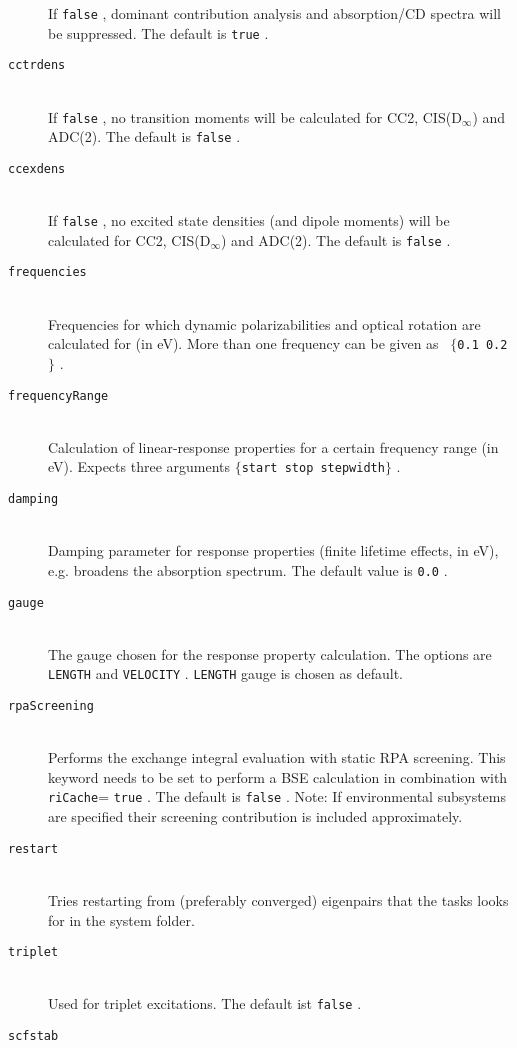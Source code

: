 \documentclass[bibliography=totocnumbered,a4paper,10pt,oneside]{scrbook}
\newcommand{\ttt}[1]{%
  \begingroup\setlength{\fboxsep}{1pt}%
  \colorbox{serenity-green!30}{\texttt{\hspace*{2pt}\vphantom{(g}#1\hspace*{2pt}}}%
  \endgroup
}
\begin{document}
\begin{description}
    If \ttt{false}, dominant contribution analysis and absorption/CD spectra will be suppressed. The default is \ttt{true}.
    \item [\texttt{cctrdens}]\hfill \\
    If \ttt{false}, no transition moments will be calculated for CC2, CIS(D$_\infty$) and ADC(2). The default is \ttt{false}.
    \item [\texttt{ccexdens}]\hfill \\
    If \ttt{false}, no excited state densities (and dipole moments) will be calculated for CC2, CIS(D$_\infty$) and ADC(2). The default is \ttt{false}.
    \item [\texttt{frequencies}]\hfill \\
    Frequencies for which dynamic polarizabilities and optical rotation are calculated for (in eV). More than one frequency can be given as~\ttt{$\{$0.1 0.2$\}$}.
    \item [\texttt{frequencyRange}]\hfill \\
    Calculation of linear-response properties for a certain frequency range (in eV). Expects three arguments \ttt{$\{$start stop stepwidth$\}$}.
    \item [\texttt{damping}]\hfill \\
    Damping parameter for response properties (finite lifetime effects, in eV), e.g. broadens the absorption spectrum. The default value is \ttt{0.0}.
    \item [\texttt{gauge}]\hfill \\
    The gauge chosen for the response property calculation. The options are \ttt{LENGTH} and \ttt{VELOCITY}. \ttt{LENGTH} gauge is chosen as default.
    \item [\texttt{rpaScreening}]\hfill \\
    Performs the exchange integral evaluation with static RPA screening. This keyword needs to be set to perform a BSE calculation in combination with \texttt{riCache}=\ttt{true}. The default is \ttt{false}. Note: If environmental subsystems are specified their screening contribution is included approximately. 
    \item [\texttt{restart}]\hfill \\
    Tries restarting from (preferably converged) eigenpairs that the tasks
    looks for in the system folder.
    \item [\texttt{triplet}]\hfill \\
    Used for triplet excitations. The default ist \ttt{false}.
    \item [\texttt{scfstab}]\hfill \\

\end{description}
\end{document}
